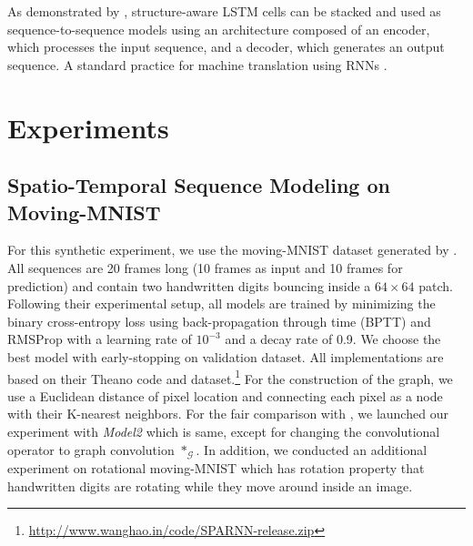 \documentclass{article} %
\newcommand{\G}{\mathcal{G}}
\begin{document}
As demonstrated by \citet{convlstm}, structure-aware LSTM cells can be stacked
and used as sequence-to-sequence models using an architecture composed of an
encoder, which processes the input sequence, and a decoder, which generates an
output sequence. A standard practice for machine translation using RNNs
\citep{gru, seq2seq}.




\section{Experiments}
\label{experiments}


\subsection{Spatio-Temporal Sequence Modeling on Moving-MNIST}

For this synthetic experiment, we use the moving-MNIST dataset generated by
\citet{convlstm}. All sequences are 20 frames long (10 frames as input and 10
frames for prediction) and contain two handwritten digits bouncing inside a $64
\times 64$ patch. Following their experimental setup, all models are trained by
minimizing the binary cross-entropy loss using back-propagation through time (BPTT)
and RMSProp with a learning rate of $10^{-3}$ and a decay rate of 0.9. We choose the best model with early-stopping on validation dataset. All
implementations are based on their Theano code and
dataset.\footnote{\url{http://www.wanghao.in/code/SPARNN-release.zip}} For the construction of the graph, we use a Euclidean distance of pixel location and connecting each pixel as a node with their K-nearest neighbors. For the fair comparison with \citep{convlstm}, we launched our experiment with {\it Model2} which is same, except for changing the convolutional operator to graph convolution $\ast_\G$. In addition, we conducted an additional experiment on rotational moving-MNIST which has rotation property that handwritten digits are rotating while they move around inside an image. 
\end{document}
